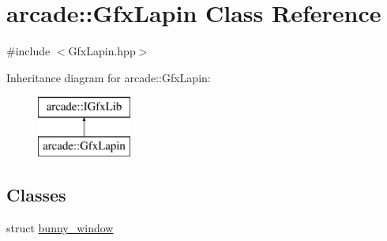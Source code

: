 \hypertarget{classarcade_1_1_gfx_lapin}{}\section{arcade\+:\+:Gfx\+Lapin Class Reference}
\label{classarcade_1_1_gfx_lapin}


{\ttfamily \#include $<$Gfx\+Lapin.\+hpp$>$}

Inheritance diagram for arcade\+:\+:Gfx\+Lapin\+:\begin{figure}[H]
\begin{center}
\leavevmode
\includegraphics[height=2.000000cm]{classarcade_1_1_gfx_lapin}
\end{center}
\end{figure}
\subsection*{Classes}
\begin{DoxyCompactItemize}
\item 
struct \hyperlink{structarcade_1_1_gfx_lapin_1_1bunny__window}{bunny\+\_\+window}
\end{DoxyCompactItemize}
